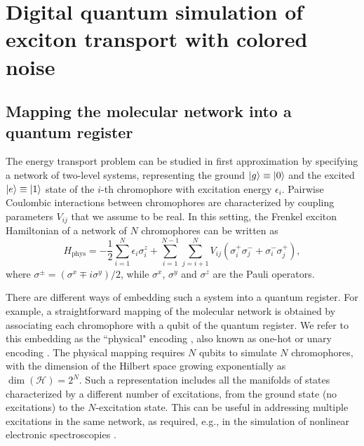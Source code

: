 \documentclass[12pt, amsmath, amssymb, graphicx]{iopart}
\begin{document}
\section{\label{sec:2}Digital quantum simulation of exciton transport with colored noise}

\subsection{Mapping the molecular network into a quantum register}

The energy transport problem can be studied in first approximation by specifying a network of two-level systems, representing the ground $\ket{g} \equiv \ket{0}$ and the excited $\ket{e} \equiv \ket{1}$ state of the $i$-th chromophore with excitation energy $\epsilon_{i}$.
Pairwise Coulombic interactions between chromophores are characterized by coupling parameters $V_{ij}$ that we assume to be real. In this setting, the Frenkel exciton Hamiltonian of a network of $N$ chromophores can be written as
%
\begin{equation} \label{eq:H_phys}
    H_{\text{phys}} = -\frac{1}{2} \sum_{i=1}^{N} \epsilon_{i} \sigma^{z}_{i} + \sum_{i=1}^{N-1} \sum_{j = i+1}^{N} V_{ij} \left(\sigma^{+}_{i} \sigma^{-}_{j} + \sigma^{-}_{i} \sigma^{+}_{j}\right),
\end{equation}
%
where $\sigma^{\pm} = \left( \sigma^{x} \mp i \sigma^{y} \right)/2$, while $\sigma^x$, $\sigma^y$ and $\sigma^z$ are the Pauli operators.

There are different ways of embedding such a system into a quantum register. For example, a straightforward mapping of the molecular network is obtained by associating each chromophore with a qubit of the quantum register. We refer to this embedding as the ``physical" encoding \cite{Gallina2022, Hines2007}, also known as one-hot or unary encoding \cite{Sawaya2020, DiMatteo2021}. The physical mapping requires $N$ qubits to simulate $N$ chromophores, with the dimension of the Hilbert space growing exponentially as $\dim(\mathcal{H}) = 2^{N}$. Such a representation includes all the manifolds of states characterized by a different number of excitations, from the ground state (no excitations) to the $N$-excitation state. This can be useful in addressing multiple excitations in the same network, as required, e.g., in the simulation of nonlinear electronic spectroscopies \cite{Bruschi2024, Bruschi2022, Bruschi2023, Bolzonello2023}.
\end{document}

